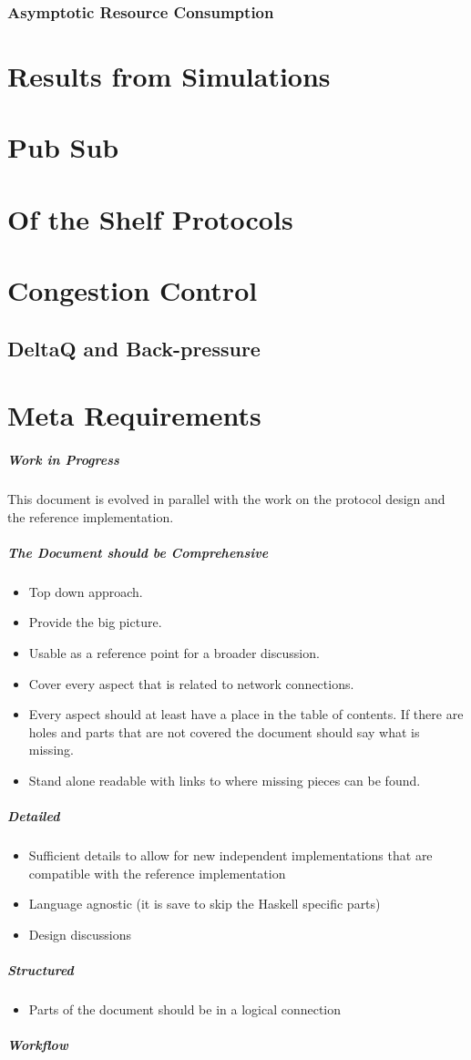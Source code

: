 \documentclass{report}
\newcommand{\wip}[1]{\color{magenta}{#1}\color{black}}
\theoremstyle{definition}{
  \newtheorem{lemma}{Lemma}[section] %
  \newtheorem{definition}[lemma]{Definition}
}
\theoremstyle{theorem}{
  \newtheorem{invariant}[lemma]{Invariant}
  \newtheorem{proofobligation}[lemma]{Proof Obligation}
}
\numberwithin{equation}{lemma}
\begin{document}
\subsubsection{Asymptotic Resource Consumption}
\section{Results from Simulations}
\section{Pub Sub}
\section{Of the Shelf Protocols}
\section{Congestion Control}
\subsection{DeltaQ and Back-pressure}
\label{deltaq-discussion}
\wip{WIP: discuss DeltaQ and Back-pressure}

\section{Meta Requirements}
\subparagraph{Work in Progress}
This document is evolved in parallel with the work on the protocol design and
the reference implementation.

\subparagraph{The Document should be Comprehensive}
\begin{itemize}
\item Top down approach.
\item Provide the big picture.
\item Usable as a reference point for a broader discussion.
\item Cover every aspect that is related to network connections.
\item Every aspect should at least have a place in the table of contents.
  If there are holes and parts that are not covered the document should say what is missing.
\item Stand alone readable with links to where missing pieces can be found.
\end{itemize}

\subparagraph{Detailed}
\begin{itemize}
\item Sufficient details to allow for new independent implementations that are compatible with
the reference implementation
\item Language agnostic (it is save to skip the Haskell specific parts)
\item Design discussions
\end{itemize}
\subparagraph{Structured}
\begin{itemize}
\item Parts of the document should be in a logical connection
\end{itemize}
\subparagraph{Workflow}
\end{document}
